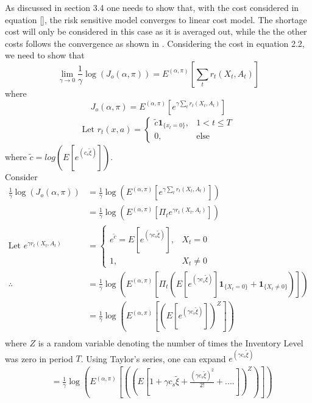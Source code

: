 \begin{appendix}
As discussed in section 3.4 one needs to show that, with the cost considered in equation [], the risk sensitive model converges to linear cost model. The shortage cost will only be considered in this case as it is averaged out, while the the other costs follows the convergence as shown in \cite{kumar2015finite}. Considering the cost in equation 2.2, we need to show that
\begin{equation}
\lim_{\gamma\rightarrow0}\frac{1}{\gamma}\log(J_o(\alpha,\pi)) = E^{(\alpha,\pi)}[ \sum_t r_t(X_t,A_t)]
\end{equation}
where
\begin{equation*}
J_o(\alpha,\pi) = E^{(\alpha,\pi)}[e^{\gamma \sum_t r_t(X_t,A_t)}] 
\end{equation*}
\begin{align}
\text{Let } r_t(x,a) = 
\begin{cases}
\tilde{c}\mathbf{1}_{\lbrace x_t=0\rbrace},&1<t\leq T\\
0,&\text{else}
\end{cases}
\end{align}
where $\tilde{c} = log(E[e^{(c_s \tilde{\xi})}]). $\\
Consider
\begin{align}
\frac{1}{\gamma}\log(J_o(\alpha,\pi))&= \frac{1}{\gamma}\log(E^{(\alpha,\pi)}[e^{\gamma \sum_t r_t(X_t,A_t)}])\\ \nonumber
&=\frac{1}{\gamma}\log(E^{(\alpha,\pi)}[\Pi_t e^{\gamma r_t(X_t,A_t)}])\\ 
\text{Let }e^{\gamma r_t(X_t,A_t)}&=
\begin{cases}
e^{\tilde{c}} = E[e^{(\gamma c_s \tilde{\xi})}],& X_t=0\\
1,& X_t\neq0
\end{cases}\\ \nonumber
\therefore &=\frac{1}{\gamma}\log(E^{(\alpha,\pi)}[\Pi_t(E[e^{(\gamma c_s \tilde{\xi})}]\mathbf{1}_{\lbrace X_t=0\rbrace} + \mathbf{1}_{\lbrace X_t\neq 0\rbrace})])\\ \nonumber
&=\frac{1}{\gamma}\log(E^{(\alpha,\pi)}[(E[e^{(\gamma c_s \tilde{\xi})}])^Z])\\ \nonumber
\end{align}
where $Z$ is a random variable denoting the number of times the Inventory Level was zero in period $T$.
Using Taylor's series, one can expand $e^{(\gamma c_s \tilde{\xi})}$
\begin{align}
&=\frac{1}{\gamma}\log(E^{(\alpha,\pi)}[((E[1 + \gamma c_s \tilde{\xi} + \frac{(\gamma c_s \tilde{\xi})^2}{2!} + ....])^Z)])

\end{align}
\end{appendix}
